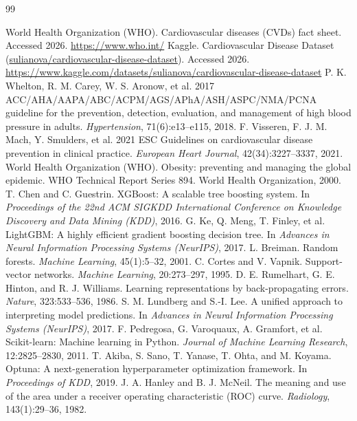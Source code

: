 \documentclass[12pt, a4paper, oneside]{book}
\begin{document}
\clearpage
{}
\renewcommand{\bibname}{References}
\begin{thebibliography}{99}
\setlength{\itemsep}{0.25em}
 World Health Organization (WHO). Cardiovascular diseases (CVDs) fact sheet. Accessed 2026. \url{https://www.who.int/}
 Kaggle. Cardiovascular Disease Dataset (\url{sulianova/cardiovascular-disease-dataset}). Accessed 2026. \url{https://www.kaggle.com/datasets/sulianova/cardiovascular-disease-dataset}
 P. K. Whelton, R. M. Carey, W. S. Aronow, et al. 2017 ACC/AHA/AAPA/ABC/ACPM/AGS/APhA/ASH/ASPC/NMA/PCNA guideline for the prevention, detection, evaluation, and management of high blood pressure in adults. \textit{Hypertension}, 71(6):e13--e115, 2018.
 F. Visseren, F. J. M. Mach, Y. Smulders, et al. 2021 ESC Guidelines on cardiovascular disease prevention in clinical practice. \textit{European Heart Journal}, 42(34):3227--3337, 2021.
 World Health Organization (WHO). Obesity: preventing and managing the global epidemic. WHO Technical Report Series 894. World Health Organization, 2000.
 T. Chen and C. Guestrin. XGBoost: A scalable tree boosting system. In \textit{Proceedings of the 22nd ACM SIGKDD International Conference on Knowledge Discovery and Data Mining (KDD)}, 2016.
 G. Ke, Q. Meng, T. Finley, et al. LightGBM: A highly efficient gradient boosting decision tree. In \textit{Advances in Neural Information Processing Systems (NeurIPS)}, 2017.
 L. Breiman. Random forests. \textit{Machine Learning}, 45(1):5--32, 2001.
 C. Cortes and V. Vapnik. Support-vector networks. \textit{Machine Learning}, 20:273--297, 1995.
 D. E. Rumelhart, G. E. Hinton, and R. J. Williams. Learning representations by back-propagating errors. \textit{Nature}, 323:533--536, 1986.
 S. M. Lundberg and S.-I. Lee. A unified approach to interpreting model predictions. In \textit{Advances in Neural Information Processing Systems (NeurIPS)}, 2017.
 F. Pedregosa, G. Varoquaux, A. Gramfort, et al. Scikit-learn: Machine learning in Python. \textit{Journal of Machine Learning Research}, 12:2825--2830, 2011.
 T. Akiba, S. Sano, T. Yanase, T. Ohta, and M. Koyama. Optuna: A next-generation hyperparameter optimization framework. In \textit{Proceedings of KDD}, 2019.
 J. A. Hanley and B. J. McNeil. The meaning and use of the area under a receiver operating characteristic (ROC) curve. \textit{Radiology}, 143(1):29--36, 1982.

\end{thebibliography}
\end{document}
